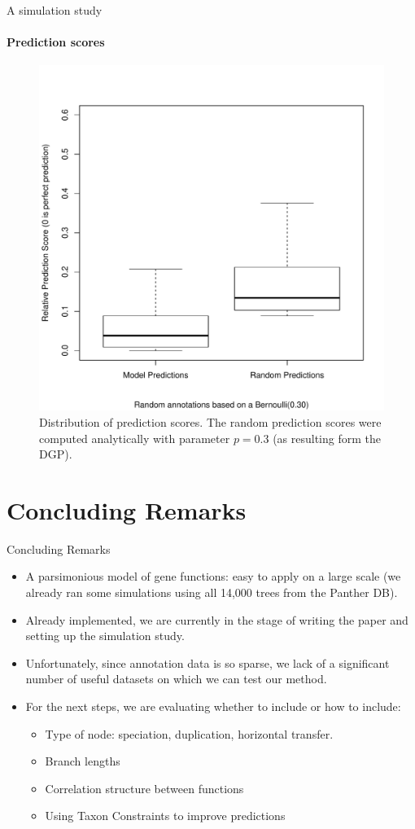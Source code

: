 \documentclass[9pt,ignorenonframetext,]{beamer}
\begin{document}
\begin{frame}[t]{A simulation study}

\framesubtitle{Prediction scores}

\begin{figure}
\centering
\includegraphics[width=.6\linewidth, trim = {0 1cm 0 2cm}, clip]{mcmc_right_prior_prediction.pdf}
\caption{Distribution of prediction scores. The random prediction scores were computed analytically with parameter $p=0.3$ (as resulting form the DGP).}
\end{figure}

\end{frame}

\section{Concluding Remarks}\label{concluding-remarks}

\begin{frame}{Concluding Remarks}

\begin{itemize}
\item
  A parsimonious model of gene functions: easy to apply on a large scale
  (we already ran some simulations using all 14,000 trees from the
  Panther DB).\pause
\item
  Already implemented, we are currently in the stage of writing the
  paper and setting up the simulation study.\pause
\item
  Unfortunately, since annotation data is so sparse, we lack of a
  significant number of useful datasets on which we can test our
  method.\pause
\item
  For the next steps, we are evaluating whether to include or how to
  include:\pause

  \begin{itemize}
  \item
    Type of node: speciation, duplication, horizontal transfer.
  \item
    Branch lengths
  \item
    Correlation structure between functions
  \item
    Using Taxon Constraints to improve predictions
  \end{itemize}
\end{itemize}

\end{frame}
\end{document}
